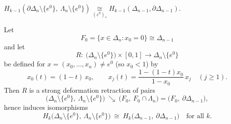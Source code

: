 \begin{proposition}\label{prop 2.6}
    $H_{k-1}(\partial \Delta_n\setminus\{e^0\},\ \Lambda_n\setminus\{e^0\})
\underset{(\varepsilon^0)_* }{\cong}
H_{k-1}(\Delta_{n-1},\partial \Delta_{n-1}).$
\end{proposition}

\begin{lemma}\label{lem:DR-face0}

Let \[F_0=\{x\in\Delta_n:x_0=0\}\cong \Delta_{n-1}\] and let
\[
R:\ \bigl(\Delta_n\setminus\{e^0\}\bigr)\times[0,1]\longrightarrow \Delta_n\setminus\{e^0\}
\]
be defined for $x=(x_0,\dots,x_n)\neq e^0$ (so $x_0<1$) by
\[
x_0(t)=(1-t)\,x_0,\qquad
x_j(t)=\dfrac{1-(1-t)x_0}{\,1-x_0\,}\,x_j\quad (j\ge 1).
\]
Then $R$ is a strong deformation retraction of pairs
\[
\bigl(\Delta_n\setminus\{e^0\},\ \Lambda_n\setminus\{e^0\}\bigr)\ \searrow\
\bigl(F_0,\ F_0\cap\Lambda_n\bigr)=\bigl(F_0,\ \partial\Delta_{n-1}\bigr),
\]
hence induces isomorphisms
\[
H_k\!\bigl(\Delta_n\setminus\{e^0\},\ \Lambda_n\setminus\{e^0\}\bigr)\ \cong\
H_k\!\bigl(\Delta_{n-1},\ \partial\Delta_{n-1}\bigr)\quad \text{for all }k .
\]
\end{lemma}

